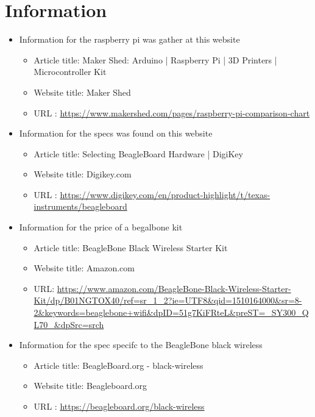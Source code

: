 \documentclass{article}
\begin{document}
\section{Information}

\begin{thebibliography}{56}

    \begin{itemize}
        \item Information for the raspberry pi was gather at this website
        \begin{itemize}
            \item Article title: Maker Shed: Arduino | Raspberry Pi | 3D Printers | Microcontroller Kit
            \item Website title: Maker Shed
            \item URL          : \url{https://www.makershed.com/pages/raspberry-pi-comparison-chart}
        \end{itemize}
    \end{itemize}

    \begin{itemize}
        \item Information for the specs was found on this website
        \begin{itemize}
            \item Article title: Selecting BeagleBoard Hardware | DigiKey
            \item Website title: Digikey.com
            \item URL          : \url{https://www.digikey.com/en/product-highlight/t/texas-instruments/beagleboard}
        \end{itemize}

        \item Information for the price of a begalbone kit
        \begin{itemize}
            \item Article title: BeagleBone Black Wireless Starter Kit
            \item Website title: Amazon.com
            \item URL: \url{https://www.amazon.com/BeagleBone-Black-Wireless-Starter-Kit/dp/B01NGTOX40/ref=sr_1_2?ie=UTF8&qid=1510164000&sr=8-2&keywords=beaglebone+wifi&dpID=51g7KiFRteL&preST=_SY300_QL70_&dpSrc=srch}
        \end{itemize}

        \item Information for the spec specifc to the BeagleBone black wireless
        \begin{itemize}
            \item Article title: BeagleBoard.org - black-wireless
            \item Website title: Beagleboard.org
            \item URL          : \url{https://beagleboard.org/black-wireless}
        \end{itemize}


\end{itemize}
\end{thebibliography}
\end{document}
